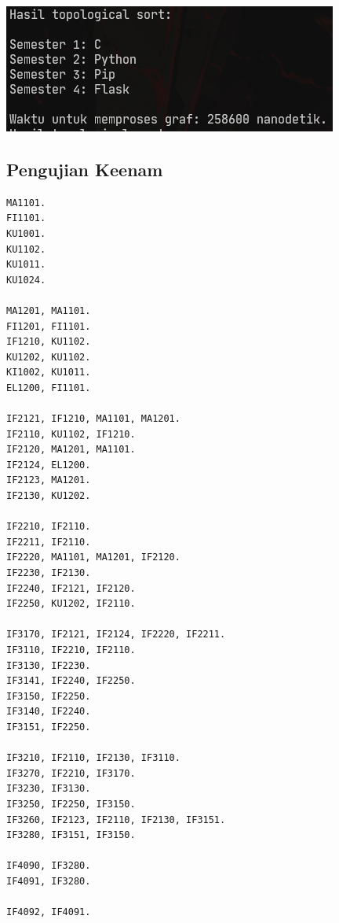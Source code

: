 \documentclass{article}
\let\origfigure\figure
\let\endorigfigure\endfigure
\renewenvironment{figure}[1][2] {
    \expandafter\origfigure\expandafter[H]
} {
    \endorigfigure
}
\begin{document}
\begin{figure}
  \includegraphics[scale=0.7]{5.png}
  \caption{\textit{input}}
\end{figure}
\subsection{Pengujian Keenam}
\begin{lstlisting}[caption = \textit{input}]
MA1101.
FI1101.
KU1001.
KU1102.
KU1011.
KU1024.

MA1201, MA1101.
FI1201, FI1101.
IF1210, KU1102.
KU1202, KU1102.
KI1002, KU1011.
EL1200, FI1101.

IF2121, IF1210, MA1101, MA1201.
IF2110, KU1102, IF1210.
IF2120, MA1201, MA1101.
IF2124, EL1200.
IF2123, MA1201.
IF2130, KU1202.

IF2210, IF2110.
IF2211, IF2110.
IF2220, MA1101, MA1201, IF2120.
IF2230, IF2130.
IF2240, IF2121, IF2120.
IF2250, KU1202, IF2110.

IF3170, IF2121, IF2124, IF2220, IF2211.
IF3110, IF2210, IF2110.
IF3130, IF2230.
IF3141, IF2240, IF2250.
IF3150, IF2250.
IF3140, IF2240.
IF3151, IF2250.

IF3210, IF2110, IF2130, IF3110.
IF3270, IF2210, IF3170.
IF3230, IF3130.
IF3250, IF2250, IF3150.
IF3260, IF2123, IF2110, IF2130, IF3151.
IF3280, IF3151, IF3150.

IF4090, IF3280.
IF4091, IF3280.

IF4092, IF4091.
\end{lstlisting}

\end{document}
